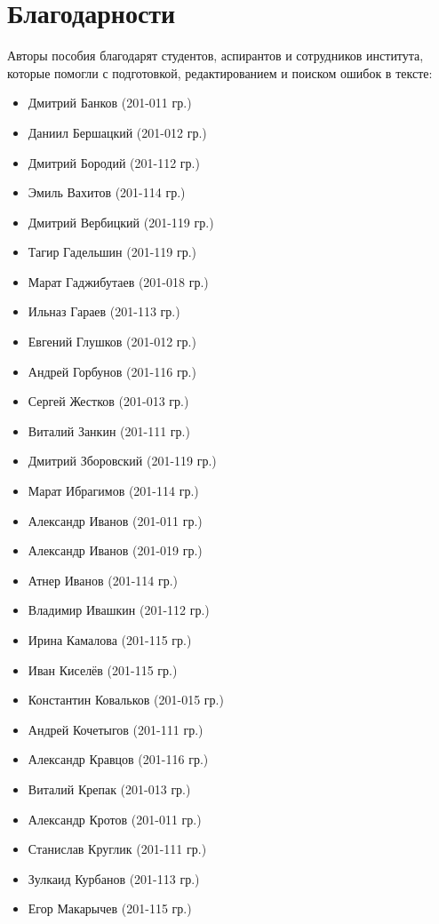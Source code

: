 \section*{Благодарности}
Авторы пособия благодарят студентов, аспирантов и сотрудников института, которые помогли с подготовкой, редактированием и поиском ошибок в тексте:

\begin{itemize}
	\item Дмитрий Банков (201-011 гр.)
	\item Даниил Бершацкий (201-012 гр.)
	\item Дмитрий Бородий (201-112 гр.)
	\item Эмиль Вахитов (201-114 гр.)
	\item Дмитрий Вербицкий (201-119 гр.)
	\item Тагир Гадельшин (201-119 гр.)
	\item Марат Гаджибутаев (201-018 гр.)
	\item Ильназ Гараев (201-113 гр.)
	\item Евгений Глушков (201-012 гр.)
	\item Андрей Горбунов (201-116 гр.)
	\item Сергей Жестков (201-013 гр.)
        \item Виталий Занкин (201-111 гр.)
	\item Дмитрий Зборовский (201-119 гр.)
	\item Марат Ибрагимов (201-114 гр.)
	\item Александр Иванов (201-011 гр.)
	\item Александр Иванов (201-019 гр.)
	\item Атнер Иванов (201-114 гр.)
	\item Владимир Ивашкин (201-112 гр.)
	\item Ирина Камалова (201-115 гр.)
	\item Иван Киселёв (201-115 гр.)
	\item Константин Ковальков (201-015 гр.)
	\item Андрей Кочетыгов (201-111 гр.)
	\item Александр Кравцов (201-116 гр.)
	\item Виталий Крепак (201-013 гр.)
	\item Александр Кротов (201-011 гр.)
	\item Станислав Круглик (201-111 гр.)
	\item Зулкаид Курбанов (201-113 гр.)
	\item Егор Макарычев (201-115 гр.)

\end{itemize}
